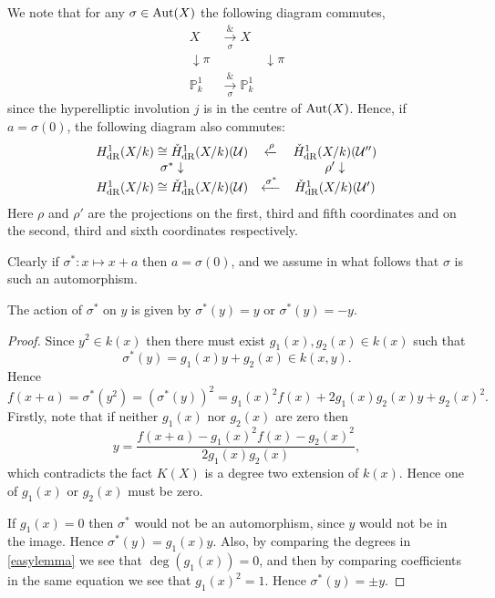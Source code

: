We note that for any $\sigma \in \operatorname{Aut}(X)$ the following diagram commutes,
    \[
    \begin{array}{ccc}
    X & \xrightarrow[\sigma] & X \\
    \downarrow\pi & & \downarrow\pi \\
    \mathbb P^1_k & \xrightarrow[\sigma] & \mathbb P_k^1
    \end{array}
    \]
since the hyperelliptic involution $j$ is in the centre of $\operatorname{Aut}(X)$.
Hence, if $a = \sigma(0)$, the following diagram also commutes:
    \[
    \begin{array}{ccc}
    H_{\text {dR}}^1(X/k) \cong \check{H}_{\text {dR}}^1(X/k)({\mathcal U})  & \xleftarrow{\rho} & \check{H}_{\text {dR}}^1(X/k)({\mathcal U}'')  \\
            \sigma^*\downarrow & ~ & \rho'\downarrow  \\
    H_{\text {dR}}^1(X/k) \cong \check{H}_{\text {dR}}^1(X/k)({\mathcal U})  & \xleftarrow{\sigma^*} & \check{H}_{\text {dR}}^1(X/k)({\mathcal U}')
    \end{array}
    \]
Here $\rho$ and $\rho'$ are the projections on the first, third and fifth coordinates and on the second, third and sixth coordinates respectively.


Clearly if $\sigma^* \colon x \mapsto x+a$ then $a = \sigma(0)$, and we assume in what follows that $\sigma$ is such an automorphism.
    \begin{lem}
    The action of $\sigma^*$ on $y$ is given by $\sigma^*(y) = y$ or $\sigma^*(y) = -y$.
    \end{lem}
    \begin{proof}
    Since $y^2 \in k(x)$ then there must exist $g_1(x), g_2(x) \in k(x)$ such that 
        \begin{equation*}
        \sigma^*(y) = g_1(x)y + g_2(x) \in k(x,y).
        \end{equation*}
    Hence
        \begin{equation}\label{easylemma}
        f(x+a) = \sigma^*(y^2) = (\sigma^*(y))^2 = g_1(x)^2f(x)+2g_1(x)g_2(x)y + g_2(x)^2.
        \end{equation}
    Firstly, note that if neither $g_1(x)$ nor $g_2(x)$ are zero then
        \[
        y = \frac{f(x+a) - g_1(x)^2f(x) - g_2(x)^2}{2g_1(x)g_2(x)},
        \]
    which contradicts the fact $K(X)$ is a degree two extension of $k(x)$.
    Hence one of $g_1(x)$ or $g_2(x)$ must be zero.
    
    If $g_1(x) = 0$ then $\sigma^*$ would not be an automorphism, since $y$ would not be in the image.
    Hence $\sigma^*(y) = g_1(x)y$.
    Also, by comparing the degrees in \eqref{easylemma} we see that $\deg(g_1(x)) = 0$, and then by comparing coefficients in the same equation we see that $g_1(x)^2 = 1$.
    Hence $\sigma^*(y) = \pm y$.
    \end{proof}

